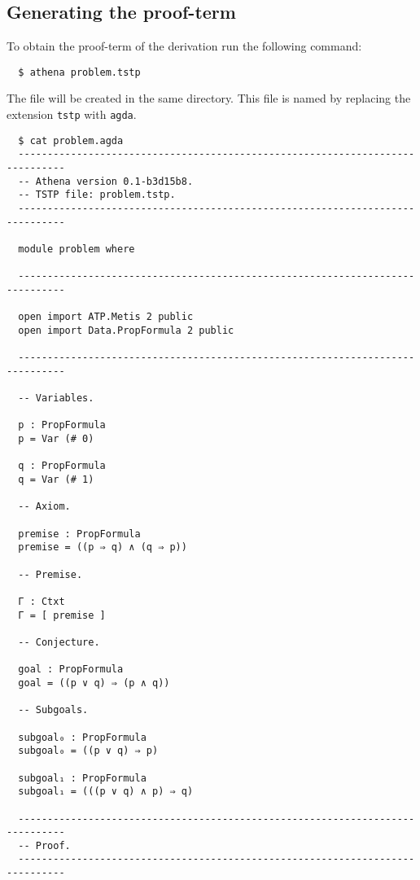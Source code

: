 \documentclass[../main.tex]{subfiles}
\begin{document}
\begin{subappendices}
\subsection{Generating the \Agda proof-term}

To obtain the \Agda proof-term of the \Metis derivation run
the following command:

\begin{verbatim}
  $ athena problem.tstp
\end{verbatim}

The \Agda file will be created in the same directory. This
file is named by replacing the extension \verb!tstp! with \verb!agda!.

\begin{verbatim}
  $ cat problem.agda
  ------------------------------------------------------------------------------
  -- Athena version 0.1-b3d15b8.
  -- TSTP file: problem.tstp.
  ------------------------------------------------------------------------------

  module problem where

  ------------------------------------------------------------------------------

  open import ATP.Metis 2 public
  open import Data.PropFormula 2 public

  ------------------------------------------------------------------------------

  -- Variables.

  p : PropFormula
  p = Var (# 0)

  q : PropFormula
  q = Var (# 1)

  -- Axiom.

  premise : PropFormula
  premise = ((p ⇒ q) ∧ (q ⇒ p))

  -- Premise.

  Γ : Ctxt
  Γ = [ premise ]

  -- Conjecture.

  goal : PropFormula
  goal = ((p ∨ q) ⇒ (p ∧ q))

  -- Subgoals.

  subgoal₀ : PropFormula
  subgoal₀ = ((p ∨ q) ⇒ p)

  subgoal₁ : PropFormula
  subgoal₁ = (((p ∨ q) ∧ p) ⇒ q)

  ------------------------------------------------------------------------------
  -- Proof.
  ------------------------------------------------------------------------------


\end{verbatim}
\end{subappendices}
\end{document}
